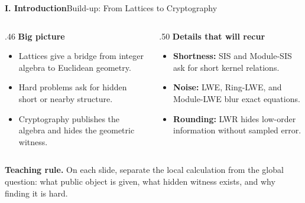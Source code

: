 \begin{frame}{\textbf{I. Introduction}}{Build-up: From Lattices to Cryptography}
\small
\begin{columns}[T,onlytextwidth]
\begin{column}{.46\textwidth}
\textcolor{TealDarkCyan}{\textbf{Big picture}}
\begin{itemize}
  \item Lattices give a bridge from integer algebra to Euclidean geometry.
  \item Hard problems ask for hidden short or nearby structure.
  \item Cryptography publishes the algebra and hides the geometric witness.
\end{itemize}
\end{column}
\begin{column}{.50\textwidth}
\textcolor{TealDarkCyan}{\textbf{Details that will recur}}
\begin{itemize}
  \item \textbf{Shortness:} SIS and Module-SIS ask for short kernel relations.
  \item \textbf{Noise:} LWE, Ring-LWE, and Module-LWE blur exact equations.
  \item \textbf{Rounding:} LWR hides low-order information without sampled error.
\end{itemize}
\end{column}
\end{columns}
\begin{center}
\end{center}
\textbf{Teaching rule.}\; On each slide, separate the local calculation from the global question:
what public object is given, what hidden witness exists, and why finding it is hard.
\end{frame}

